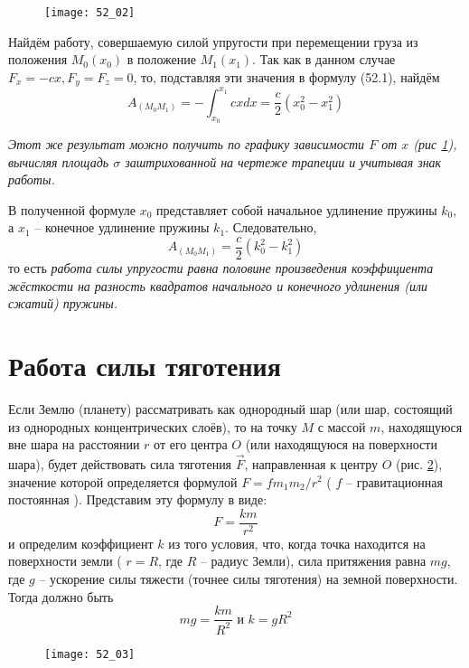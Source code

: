 \begin{figure}[h!]
    \texttt{[image: 52\_02]}
    \parbox{.47\textwidth}{\caption{} \label{pic52_02}}
\end{figure}

Найдём работу, совершаемую силой упругости при перемещении груза из 
положения \( M_0(x_0) \) в положение \( M_1(x_1) \). Так как в данном 
случае \( F_x = -cx, F_y = F_z = 0 \), то, подставляя эти значения в 
формулу (52.1), найдём
\[ 
    A_{(M_0 M_1)} = - \int_{x_0}^{x_1} cxdx = 
    \frac{c}{2} \left( x^{2}_0 - x^{2}_1 \right) 
\]

\emph{Этот же результат можно получить по графику зависимости 
\( F \) от \( x \) (рис \ref{pic52_02}), вычисляя площадь \( \sigma \) 
заштрихованной на чертеже трапеции и учитывая знак работы.}

В полученной формуле \( x_0 \) представляет собой начальное удлинение 
пружины \( k_0 \), а \( x_1 \) -- конечное удлинение пружины \( k_1 \). 
Следовательно, 
\[ A_{(M_0 M_1)} = \frac{c}{2} \left( k^{2}_0 - k^{2}_1 \right) \]
то есть \emph{работа силы упругости равна половине произведения 
коэффициента жёсткости на разность квадратов начального и конечного 
удлинения (или сжатий) пружины.}

\section{Работа силы тяготения}
Если Землю (планету) рассматривать как однородный шар (или шар, 
состоящий из однородных концентрических слоёв), то на точку \( M \) с 
массой \( m \), находящуюся вне шара на расстоянии \( r \) от его 
центра \( O \) (или находящуюся на поверхности шара), будет действовать 
сила тяготения \( \vec{F} \), направленная к центру \( O \) (рис. \ref{pic52_03}), 
значение которой определяется формулой \( F = fm_1 m_2 / r^2 \) 
( \( f \) -- гравитационная постоянная ). Представим эту формулу в виде: 
\[ F = \frac{km}{r^2} \]
и определим коэффициент \( k \) из того условия, что, когда точка 
находится на поверхности земли ( \( r = R \), где \( R \) -- радиус Земли), 
сила притяжения равна \( mg \), где \( g \) -- ускорение силы тяжести 
(точнее силы тяготения) на земной поверхности. Тогда должно быть
\[ mg = \frac{km}{R^2} \text{ и } k = gR^2 \]

\begin{figure}[h!]
    \texttt{[image: 52\_03]}
    \parbox{.47\textwidth}{\caption{} \label{pic52_03}}
\end{figure}

